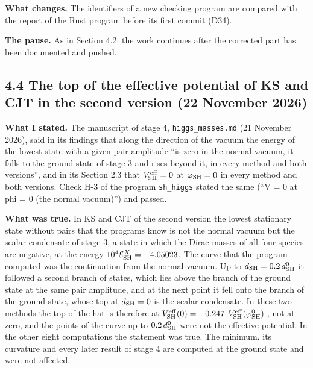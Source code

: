 \documentclass[
  10pt,
]{article}
\begin{document}
\textbf{What changes.} The identifiers of a new checking program are
compared with the report of the Rust program before its first commit
(D34).

\textbf{The pause.} As in Section 4.2: the work continues after the
corrected part has been documented and pushed.

\hypertarget{the-top-of-the-effective-potential-of-ks-and-cjt-in-the-second-version-22-november-2026}{%
\subsection{4.4 The top of the effective potential of KS and CJT in the
second version (22 November
2026)}\label{the-top-of-the-effective-potential-of-ks-and-cjt-in-the-second-version-22-november-2026}}

\textbf{What I stated.} The manuscript of stage 4,
\texttt{higgs\_masses.md} (21 November 2026), said in its findings that
along the direction of the vacuum the energy of the lowest state with a
given pair amplitude ``is zero in the normal vacuum, it falls to the
ground state of stage 3 and rises beyond it, in every method and both
versions'', and in its Section 2.3 that \(V^{\rm eff}_{\rm SH}=0\) at
\(\varphi_{\rm SH}=0\) in every method and both versions. Check H-3 of
the program \texttt{sh\_higgs} stated the same (``V = 0 at phi = 0 (the
normal vacuum)'') and passed.

\textbf{What was true.} In KS and CJT of the second version the lowest
stationary state without pairs that the programs know is not the normal
vacuum but the scalar condensate of stage 3, a state in which the Dirac
masses of all four species are negative, at the energy
\(10^4\mathcal E^X_{\rm SH}=-4.05023\). The curve that the program
computed was the continuation from the normal vacuum. Up to
\(d_{\rm SH}=0.2\,d^0_{\rm SH}\) it followed a second branch of states,
which lies above the branch of the ground state at the same pair
amplitude, and at the next point it fell onto the branch of the ground
state, whose top at \(d_{\rm SH}=0\) is the scalar condensate. In these
two methods the top of the hat is therefore at
\(V^{\rm eff}_{\rm SH}(0)=-0.247\,\lvert V^{\rm eff}_{\rm SH}(\varphi^0_{\rm SH})\rvert\),
not at zero, and the points of the curve up to \(0.2\,d^0_{\rm SH}\)
were not the effective potential. In the other eight computations the
statement was true. The minimum, its curvature and every later result of
stage 4 are computed at the ground state and were not affected.
\end{document}
